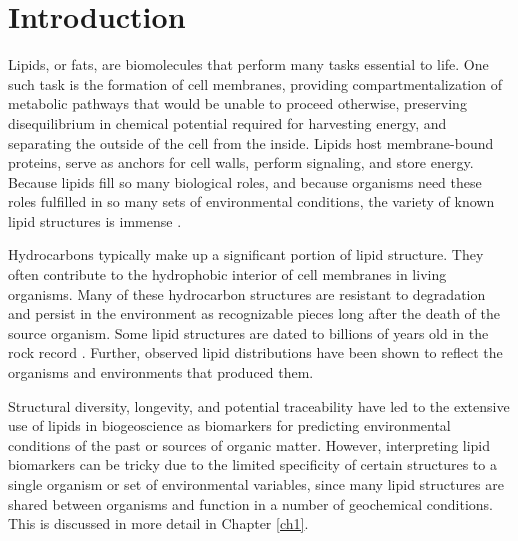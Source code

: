 \chapter[INTRODUCTION]{Introduction}


Lipids, or fats, are biomolecules that perform many tasks essential to life. One such task is the formation of cell membranes, providing compartmentalization of metabolic pathways that would be unable to proceed otherwise, preserving disequilibrium in chemical potential required for harvesting energy, and separating the outside of the cell from the inside. Lipids host membrane-bound proteins, serve as anchors for cell walls, perform signaling, and store energy. Because lipids fill so many biological roles, and because organisms need these roles fulfilled in so many sets of environmental conditions, the variety of known lipid structures is immense \citep{Sturt_Intact_2004, belin2018hopanoid, van2008membrane, Yoshinaga_Systematic_2011, schouten2013organic}.


Hydrocarbons typically make up a significant portion of lipid structure. They often contribute to the hydrophobic interior of cell membranes in living organisms. Many of these hydrocarbon structures are resistant to degradation and persist in the environment as recognizable pieces long after the death of the source organism. Some lipid structures are dated to billions of years old in the rock record \citep{brocks2003composition, brocks2003reconstruction}. Further, observed lipid distributions have been shown to reflect the organisms and environments that produced them. %

Structural diversity, longevity, and potential traceability have led to the extensive use of lipids in biogeoscience as biomarkers for predicting environmental conditions of the past or sources of organic matter. However, interpreting lipid biomarkers can be tricky due to the limited specificity of certain structures to a single organism or set of environmental variables, since many lipid structures are shared between organisms and function in a number of geochemical conditions. This is discussed in more detail in Chapter \ref{ch1}.

